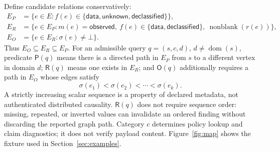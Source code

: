 \documentclass[11pt,letterpaper]{article}
\newcommand{\dom}{\operatorname{dom}}
\newcommand{\OO}{\mathsf{O}}
\newcommand{\RR}{\mathsf{R}}
\newcommand{\PP}{\mathsf{P}}
\begin{document}
Define candidate relations conservatively:
\begin{align}
E_P &= \{e\in E : f(e)\in\{\mathsf{data},\mathsf{unknown},\mathsf{declassified}\}\}, \label{eq:possible}\\
E_R &= \{e\in E_P : m(e)=\mathsf{observed},\ f(e)\in\{\mathsf{data},\mathsf{declassified}\},\ \operatorname{nonblank}(r(e))\}, \label{eq:reported}\\
E_O &= \{e\in E_R : \sigma(e)\ne\bot\}.\label{eq:orderededge}
\end{align}
Thus \(E_O\subseteq E_R\subseteq E_P\). For an admissible query \(q=(s,c,d)\), \(d\ne\dom(s)\), predicate \(\PP(q)\) means there is a directed path in \(E_P\) from \(s\) to a different vertex in domain \(d\); \(\RR(q)\) means one exists in \(E_R\); and \(\OO(q)\) additionally requires a path in \(E_O\) whose edges satisfy
\begin{equation}
\sigma(e_1)<\sigma(e_2)<\cdots<\sigma(e_k).\label{eq:strict}
\end{equation}
A strictly increasing scalar sequence is a property of declared metadata, not authenticated distributed causality. \(\RR(q)\) does not require sequence order: missing, repeated, or inverted values can invalidate an ordered finding without discarding the reported graph path. Category \(c\) determines policy lookup and claim diagnostics; it does not verify payload content. Figure~\ref{fig:map} shows the fixture used in Section~\ref{sec:examples}.
\end{document}
